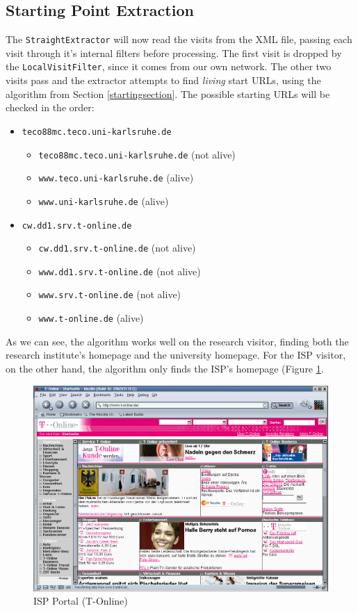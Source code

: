 \documentclass[a4paper,twoside]{danarticle}
\theoremstyle{remark}
\begin{document}
    \subsection{Starting Point Extraction}
      The \verb$StraightExtractor$ will now read the visits from the XML file,
      passing each visit through it's internal filters before processing. The
      first visit is dropped by the \verb$LocalVisitFilter$, since it comes
      from our own network. The other two visits pass and the extractor
      attempts to find \textit{living} start URLs, using the algorithm from
      Section \ref{startingsection}. The possible starting URLs will be checked in the
      order:
      \begin{itemize}
        \item{\verb$teco88mc.teco.uni-karlsruhe.de$}
        \begin{itemize}
          \item{\verb$teco88mc.teco.uni-karlsruhe.de$ (not alive)}
          \item{\verb$www.teco.uni-karlsruhe.de$ (alive)}
          \item{\verb$www.uni-karlsruhe.de$ (alive)}
        \end{itemize}
        \item{\verb$cw.dd1.srv.t-online.de$}
        \begin{itemize}
          \item{\verb$cw.dd1.srv.t-online.de$ (not alive)}
          \item{\verb$www.dd1.srv.t-online.de$ (not alive)}
          \item{\verb$www.srv.t-online.de$ (not alive)}
          \item{\verb$www.t-online.de$ (alive)}
        \end{itemize}
      \end{itemize}
      As we can see, the algorithm works well on the research visitor, finding
      both the research institute's homepage and the university homepage. For
      the ISP visitor, on the other hand, the algorithm only finds the ISP's
      homepage (Figure \ref{tolhome}.
      
      \begin{figure}[ht]
        \centering
        \includegraphics[width=12cm]{tolhome}
        \caption{ISP Portal (T-Online)}
        \label{tolhome}
      \end{figure}
      
\end{document}
